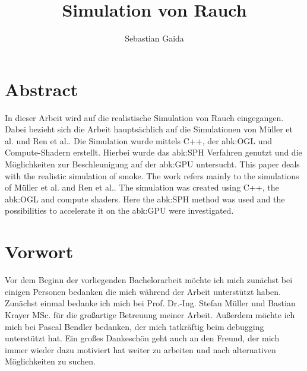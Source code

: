 \documentclass[intern,palatino]{cgBA}
\author{Sebastian Gaida}
\title{Simulation von Rauch}
\begin{document}
	\maketitle
	\newpage
	\tableofcontents
	\clearpage         %
	


\section*{Abstract}

In dieser Arbeit wird auf die realistische Simulation von Rauch eingegangen. Dabei bezieht sich die Arbeit hauptsächlich auf die Simulationen von Müller et al.\cite{muller2003particle} und Ren et al.\cite{ren2016fast}. Die Simulation wurde mittels C++, der \ac{abk:OGL} und Compute-Shadern erstellt. Hierbei wurde das \ac{abk:SPH} Verfahren genutzt und die Möglichkeiten zur Beschleunigung auf der \ac{abk:GPU} untersucht.
\newline \newline
This paper deals with the realistic simulation of smoke. The work refers mainly to the simulations of Müller et al.\cite{muller2003particle} and Ren et al.\cite{ren2016fast}. The simulation was created using C++, the \acl{abk:OGL} and compute shaders. Here the \acl{abk:SPH} method was used and the possibilities to accelerate it on the \ac{abk:GPU} were investigated.
\newpage


\section{Vorwort}

Vor dem Beginn der vorliegenden Bachelorarbeit möchte ich mich zunächst bei einigen Personen bedanken die mich während der Arbeit unterstützt haben.
\newline \newline
Zunächst einmal bedanke ich mich bei Prof. Dr.-Ing. Stefan Müller und Bastian Krayer MSc. für die großartige Betreuung meiner Arbeit.
\newline
Außerdem möchte ich mich bei Pascal Bendler bedanken, der mich tatkräftig beim debugging unterstützt hat.
\newline
Ein großes Dankeschön geht auch an den Freund, der mich immer wieder dazu motiviert hat weiter zu arbeiten und nach alternativen Möglichkeiten zu suchen.
\newpage
\end{document}
